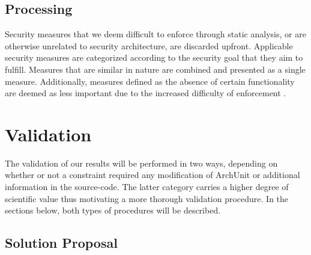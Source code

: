\subsection{Processing}


Security measures that we deem difficult to enforce through static analysis, or are otherwise unrelated to security architecture, are discarded upfront. Applicable security measures are categorized according to the security goal that they aim to fulfill. Measures that are similar in nature are combined and presented as a single measure. Additionally, measures defined as the absence of certain functionality are deemed as less important due to the increased difficulty of enforcement \cite{haley_security_2008}. 



\section{Validation}

The validation of our results will be performed in two ways, depending on whether or not a constraint required any modification of ArchUnit or additional information in the source-code. The latter category carries a higher degree of scientific value thus motivating a more thorough validation procedure. In the sections below, both types of procedures will be described. 

\subsection{Solution Proposal}

